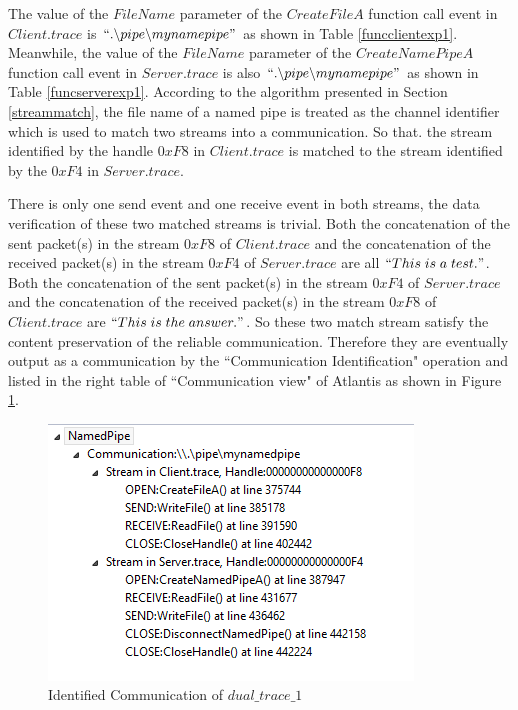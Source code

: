The value of the $FileName$ parameter of the $CreateFileA$ function call event in $Client.trace$ is $``.\backslash pipe \backslash mynamepipe"$ as shown in Table \ref{funcclientexp1}. Meanwhile, the value of the $FileName$ parameter of the $CreateNamePipeA$ function call event in $Server.trace$ is also $``.\backslash pipe \backslash mynamepipe"$ as shown in Table \ref{funcserverexp1}. According to the algorithm presented in Section \ref{streammatch}, the file name of a named pipe is treated as the channel identifier which is used to match two streams into a communication. So that. the stream identified by the handle $0xF8$ in $Client.trace$ is matched to the stream identified by the $0xF4$ in $Server.trace$.

There is only one send event and one receive event in both streams, the data verification of these two matched streams is trivial. Both the concatenation of the sent packet(s) in the stream $0xF8$ of $Client.trace$ and the concatenation of the received packet(s) in the stream $0xF4$ of $Server.trace$ are all $``This\; is\; a\; test."$. Both the concatenation of the sent packet(s) in the stream $0xF4$ of $Server.trace$ and the concatenation of the received packet(s) in the stream $0xF8$ of $Client.trace$ are $``This\; is\; the\; answer."$. So these two match stream satisfy the content preservation of the reliable communication. Therefore they are eventually output as a communication by the ``Communication Identification" operation and listed in the right table of ``Communication view" of Atlantis as shown in Figure \ref{result1_communications}.


\begin{figure}[H]
\centerline{\includegraphics[scale=0.65]{Figures/result1_communications}}
 \caption{Identified Communication of $dual\_trace\_1$}
\label{result1_communications}
\end{figure}


